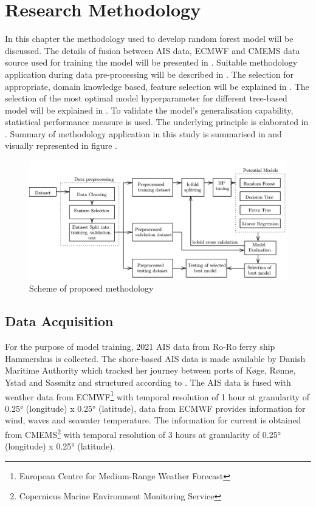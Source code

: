 \section{Research Methodology} \label{method}

In this chapter the methodology used to develop random forest model will be discussed. The details of fusion between AIS data, ECMWF and CMEMS data source used for training the model will be presented in . Suitable methodology application during data pre-processing will be described in . The selection for appropriate, domain knowledge based, feature selection will be explained in . The selection of the most optimal model hyperparameter for different tree-based model will be explained in . To validate the model's generalisation capability, statistical performance measure is used. The underlying principle is elaborated in . Summary of methodology application in this study is summarised in  and visually represented in figure . 

\begin{figure}[h]
    \centering
        \includegraphics[width=\textwidth]{02_figures/flowmethod2.png}
        \caption{Scheme of proposed methodology}
        \label{fig:flowchart}
\end{figure}

\subsection{Data Acquisition}\label{data_acquisition}

For the purpose of model training, 2021 AIS data from Ro-Ro ferry ship Hammershus is collected. The shore-based AIS data is made available by Danish Maritime Authority which tracked her journey between ports of K{\o}ge, R{\o}nne, Ystad and Sassnitz and structured according to . The AIS data is fused with weather data from ECMWF\footnote{European Centre for Medium-Range Weather Forecast} with temporal resolution of 1 hour at granularity of 0.25° (longitude) x 0.25° (latitude), data from ECMWF provides information for wind, waves and seawater temperature. The information for current is obtained from CMEMS\footnote{Copernicus Marine Environment Monitoring Service} with temporal resolution of 3 hours at granularity of  0.25° (longitude) x 0.25° (latitude).\\ 

